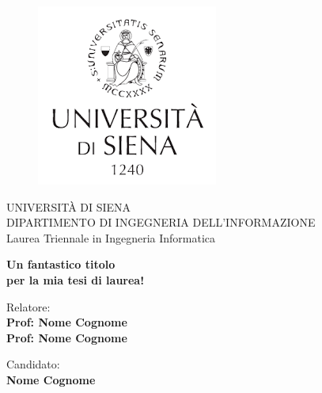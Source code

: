 \begin{titlepage}
\begin{figure}[!htb]
    \centering
    \includegraphics[keepaspectratio=true,scale=0.8]{format/img/unisi.png}
\end{figure}

\begin{center}
    \LARGE{UNIVERSITÀ DI SIENA}
    \vspace{5mm}
    \\ \large{DIPARTIMENTO DI INGEGNERIA DELL'INFORMAZIONE}
    \vspace{5mm}
    \\ \LARGE{Laurea Triennale in Ingegneria Informatica}
\end{center}

\vspace{15mm}
\begin{center}
    {\LARGE{\bf Un fantastico titolo\\ \vspace{5mm} per la mia tesi di laurea! }}
    
    
\end{center}
\vspace{30mm}

\begin{minipage}[t]{0.47\textwidth}
	{\large{Relatore:}{\normalsize\vspace{3mm}
	\bf\\ \large{Prof: Nome Cognome} \normalsize\vspace{3mm}\bf \\ \large{Prof: Nome Cognome}}}
\end{minipage}
\hfill
\begin{minipage}[t]{0.47\textwidth}\raggedleft
	{\large{Candidato:}{\normalsize\vspace{3mm} \bf\\ \large{Nome Cognome}}}
\end{minipage}

\vspace{30mm}

\end{titlepage}